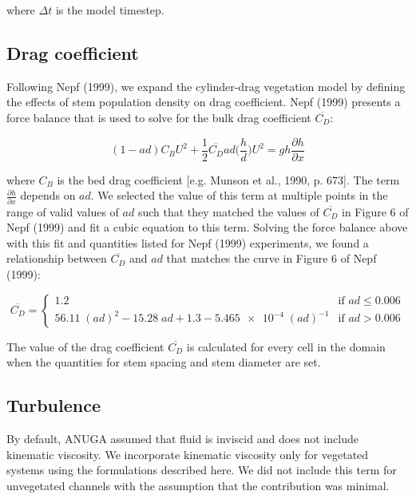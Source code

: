 \documentclass[11pt]{article}
\begin{document}
\noindent where $\Delta t$ is the model timestep.

\subsection{Drag coefficient}

Following Nepf (1999), we expand the cylinder-drag vegetation model by defining the effects of stem population density on drag coefficient. Nepf (1999) presents a force balance that is used to solve for the bulk drag coefficient $\overline{C_D}$:

\begin{equation}
(1 - a d) C_B U^2 + \frac{1}{2} \overline{C_D} a d \big(\frac{h}{d}\big) U^2 = g h \frac{\partial h}{\partial x}
\end{equation}

\noindent where $C_B$ is the bed drag coefficient [e.g. Munson et al., 1990, p. 673]. The term $\frac{\partial h}{\partial x}$ depends on $a d$. We selected the value of this term at multiple points in the range of valid values of $a d$ such that they matched the values of $\overline{C_D}$ in Figure 6 of Nepf (1999) and fit a cubic equation to this term. Solving the force balance above with this fit and quantities listed for Nepf (1999) experiments, we found a relationship between $\overline{C_D}$ and $a d$ that matches the curve in Figure 6 of Nepf (1999):

\[
 \overline{C_D} = 
  \begin{cases} 
   1.2 & \text{if } a d \leq 0.006 \\
   56.11\;(ad)^2 - 15.28\;ad + 1.3 - \num{5.465e-4}\;(ad)^{-1}       & \text{if } ad > 0.006
  \end{cases}
\]

The value of the drag coefficient $\overline{C_D}$ is calculated for every cell in the domain when the quantities for stem spacing and stem diameter are set.

\subsection{Turbulence}

By default, ANUGA assumed that fluid is inviscid and does not include kinematic viscosity. We incorporate kinematic viscosity only for vegetated systems using the formulations described here. We did not include this term for unvegetated channels with the assumption that the contribution was minimal.
\end{document}
